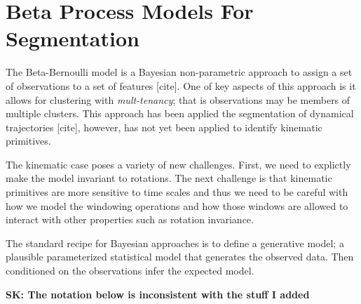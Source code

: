 \section{Beta Process Models For Segmentation}
The Beta-Bernoulli model is a Bayesian non-parametric approach to assign 
a set of observations to a set of features [cite].
One of key aspects of this approach is it allows for clustering with \emph{mult-tenancy}; 
that is observations may be members of multiple clusters.
This approach has been applied the segmentation of dynamical trajectories [cite], however,
has not yet been applied to identify kinematic primitives.

The kinematic case poses a variety of new challenges.
First, we need to explictly make the model invariant to rotations.
The next challenge is that kinematic primitives are more sensitive to
time scales and thus we need to be careful with how we model the windowing operations
and how those windows are allowed to interact with other properties such as rotation invariance.

The standard recipe for Bayesian approaches is to define a generative model; a plausible parameterized statistical model
that generates the observed data.
Then conditioned on the observations infer the expected model.

\textbf{SK: The notation below is inconsistent with the stuff I added}
